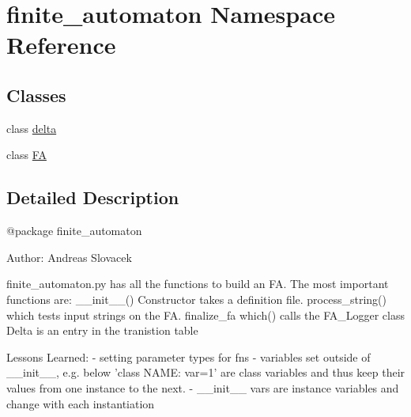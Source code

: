 \hypertarget{namespacefinite__automaton}{}\section{finite\+\_\+automaton Namespace Reference}
\label{namespacefinite__automaton}
\subsection*{Classes}
\begin{DoxyCompactItemize}
\item 
class \mbox{\hyperlink{classfinite__automaton_1_1delta}{delta}}
\item 
class \mbox{\hyperlink{classfinite__automaton_1_1_f_a}{FA}}
\end{DoxyCompactItemize}


\subsection{Detailed Description}
\begin{DoxyVerb}@package finite_automaton

Author: Andreas Slovacek

finite_automaton.py has all the functions to build an FA. The most important functions are:
   __init__() Constructor takes a definition file.
  process_string() which tests input strings on the FA.
  finalize_fa which() calls the FA_Logger
  class Delta is an entry in the tranistion table

Lessons Learned:
   - setting parameter types for fns
   - variables set outside of __init__, e.g. below 'class NAME: var=1' are class variables
 and thus keep their values from one instance to the next.
   - __init__ vars are instance variables and change with each instantiation
\end{DoxyVerb}
 